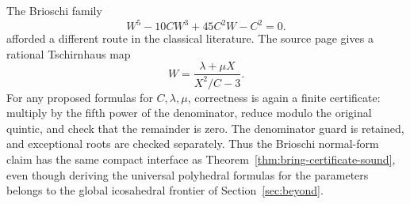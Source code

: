 The Brioschi family
\[
 W^5-10CW^3+45C^2W-C^2=0.
\]
afforded a different route in the classical literature.  The source page gives
a rational Tschirnhaus map
\[
 W=\frac{\lambda+\mu X}{X^2/C-3}.
\]
For any proposed formulas for \(C,\lambda,\mu\), correctness is again a finite
certificate: multiply by the fifth power of the denominator, reduce modulo the
original quintic, and check that the remainder is zero.  The denominator guard
is retained, and exceptional roots are checked separately.  Thus the Brioschi
normal-form claim has the same compact \ipra{} interface as
Theorem~\ref{thm:bring-certificate-sound}, even though deriving the universal
polyhedral formulas for the parameters belongs to the global icosahedral
frontier of Section~\ref{sec:beyond}.
